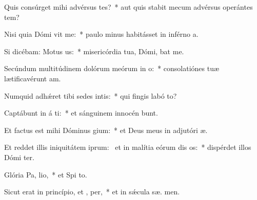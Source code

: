 \item Quis consúrget mihi advérsus tes?~* aut quis stabit mecum advérsus operántes tem?
\item Nisi quia Dómi vit me:~* paulo minus habitásset in inférno  a.
\item Si dicébam: Motus   us:~* misericórdia tua, Dómi, bat me.
\item Secúndum multitúdinem dolórum meórum in  o:~* consolatiónes tuæ lætificavérunt  am.
\item Numquid adhǽret tibi sedes intis:~* qui fingis labó  to?
\item Captábunt in á ti:~* et sánguinem innocén bunt.
\item Et factus est mihi Dóminus  gium:~* et Deus meus in adjutóri  æ.
\item Et reddet illis iniquitátem iprum:~\pscross{} et in malítia eórum dis os:~* dispérdet illos Dómi  ter.
\item Glória Pa,  lio,~* et Spi to.
\item Sicut erat in princípio, et ,  per,~* et in sǽcula sæ. men.
